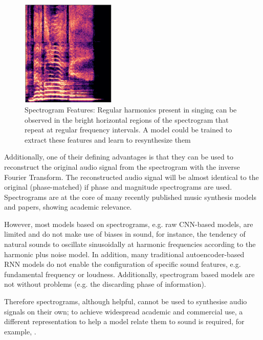 \begin{figure}[H]
    \centering
    \includegraphics[width=0.4\textwidth]{literature_review/SpectrogramFeatures.png}
    \caption{Spectrogram Features: Regular harmonics present in singing can be observed in the bright horizontal regions of the spectrogram that repeat at regular frequency intervals. A model could be trained to extract these features and learn to resynthesize them}
    \label{fig:spectrogram_features}
\end{figure}


Additionally, one of their defining advantages is that they can be used to reconstruct the original audio signal from the spectrogram with the inverse Fourier Transform. The reconstructed audio signal will be almost identical to the original (phase-matched) if phase and magnitude spectrograms are used.
Spectrograms are at the core of many recently published music synthesis models and papers, showing academic relevance.

However, most models based on spectrograms, e.g. raw CNN-based models, are limited and do not make use of biases in sound, for instance, the tendency of natural sounds to oscillate sinusoidally at harmonic frequencies according to the harmonic plus noise model. In addition, many traditional autoencoder-based RNN models do not enable the configuration of specific sound features, e.g. fundamental frequency or loudness. Additionally, spectrogram based models are not without problems (e.g. the discarding phase of information).

Therefore spectrograms, although helpful, cannot be used to synthesise audio signals on their own; to achieve widespread academic and commercial use, a different representation to help a model relate them to sound is required, for example, .